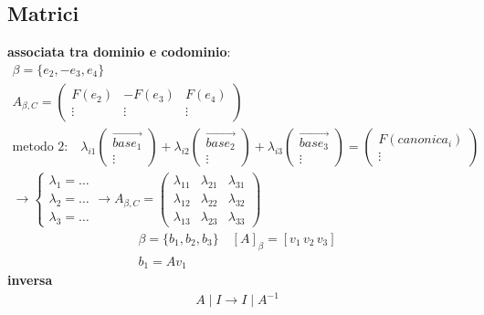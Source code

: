 \documentclass{article}
\begin{document}
\subsection*{Matrici}
\textbf{associata tra dominio e codominio}:
\begin{align}
    \beta=\{e_2,-e_3,e_4\} \\
    A_{\beta,C}=\begin{pmatrix}
        F(e_2) & -F(e_3)& F(e_4)\\
        \vdots & \vdots & \vdots 
    \end{pmatrix} \\
    \text{metodo 2:} \quad 
    \lambda_{i1}\begin{pmatrix}
        \vec{base_1} \\ \vdots
    \end{pmatrix}+\lambda_{i2}\begin{pmatrix}
        \vec{base_2} \\ \vdots
    \end{pmatrix}+\lambda_{i3}\begin{pmatrix}
        \vec{base_3} \\ \vdots
    \end{pmatrix}=\begin{pmatrix}
        F(canonica_i) \\ \vdots
    \end{pmatrix}\\
    \to \begin{cases}
        \lambda_1=\dots \\
        \lambda_2=\dots \\
        \lambda_3=\dots
    \end{cases} \to
       A_{\beta,C}=\begin{pmatrix}
        \lambda_{11} & \lambda_{21} & \lambda_{31} \\
        \lambda_{12} & \lambda_{22} & \lambda_{32} \\
        \lambda_{13} & \lambda_{23} & \lambda_{33}
    \end{pmatrix}
\end{align}
\begin{align}
    \beta=\{b_1,b_2,b_3\} \quad [A]_{\beta}=[v_1 \, v_2 \, v_3]\\
    b_1=Av_1
\end{align}
\textbf{inversa}
\begin{align}
    A\mid I \to I\mid A^{-1}
\end{align}
\end{document}
